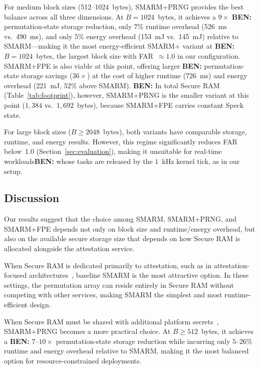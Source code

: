 \documentclass{ieeeaccess}
\DeclareRobustCommand{\ben}[1]{{\color{BENcolor}\textbf{BEN:} #1}}
\newcommand{\rtsmarm}{SMARM+\xspace}
\newcommand{\rtsmarmone}{SMARM+PRNG\xspace}
\newcommand{\rtsmarmtwo}{SMARM+FPE\xspace}
\begin{document}
For medium block sizes (512--1024~bytes), \rtsmarmone 
provides the best balance across all three dimensions. 
At $B = 1024$~bytes, it achieves a $9\times$ \ben{permutation-state} storage 
reduction, only $7\%$ runtime overhead (526~ms vs.\ 
490~ms), and only $5\%$ energy overhead (153~mJ vs.\ 
145~mJ) relative to SMARM---making it the most 
energy-efficient \rtsmarm variant at \ben{$B = 1024$~bytes, the largest block size with FAR~$\approx 1.0$ in our configuration}.
\rtsmarmtwo is also viable at this point, offering larger 
\ben{permutation-state} storage savings ($36\times$) at the cost of higher runtime 
(726~ms) and energy overhead (221~mJ, $52\%$ above SMARM).
\ben{In total Secure RAM (Table~\ref{tab:footprint}), however, \rtsmarmone is the smaller variant at this point ($1{,}384$ vs.\ $1{,}692$~bytes), because \rtsmarmtwo carries constant Speck state.}

For large block sizes ($B \geq 2048$~bytes), both variants 
have comparable storage, runtime, and energy results. 
However, this regime significantly reduces FAR 
below~1.0 (Section~\ref{sec:evaluation}), making it 
unsuitable for real-time workloads\ben{ whose tasks are released by the $1$~kHz kernel tick, as in our setup}.



\subsection{Discussion}
\label{sec:resmarm-discussion}

Our results suggest that the choice among SMARM, \rtsmarmone, and \rtsmarmtwo depends not only on block size and runtime/energy overhead, but also on the available secure storage size that depends on how Secure RAM is allocated alongside the attestation service.

When Secure RAM is dedicated primarily to attestation, such as in attestation-focused architectures~\cite{smart,hydra}, baseline SMARM is the most attractive option.
In these settings, the permutation array can reside entirely in Secure RAM without competing with other services, making SMARM the simplest and most runtime-efficient design.


When Secure RAM must be shared with additional platform 
secrets~\cite{silabs-secure-key-storage}, \rtsmarmone 
becomes a more practical choice. At $B \geq 512$~bytes, 
it achieves a \ben{$7$--$10\times$ permutation-state} storage reduction while incurring 
only $5$--$26\%$ runtime and energy overhead relative to 
SMARM, making it the most balanced option for 
resource-constrained deployments.
\end{document}
